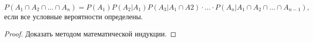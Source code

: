 \begin{theorem}
\begin{equation*}
	P(A_1 \cap A_2 \cap\ldots\cap A_n ) = P(A_1)P(A_2 |A_1 )P(A_3 |A_1 \cap A2 )\cdot... \cdot P(A_n |A_1 \cap A_2 \cap\ldots\cap A_{n−1}),
\end{equation*}
если все условные вероятности определены.
\end{theorem}
\begin{proof}
Доказать методом математической индукции.	
\end{proof}
